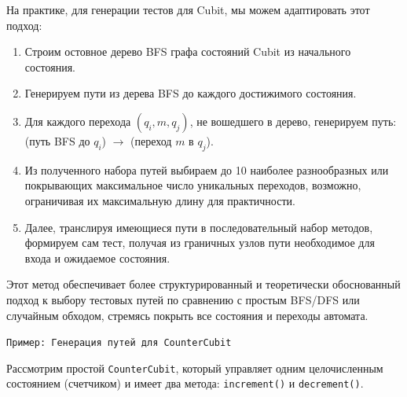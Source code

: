 \documentclass[14pt, russian]{scrartcl}
\begin{document}
На практике, для генерации тестов для Cubit, мы можем адаптировать этот подход:
\begin{enumerate}
    \item Строим остовное дерево BFS графа состояний Cubit из начального состояния.
    \item Генерируем пути из дерева BFS до каждого достижимого состояния.
    \item Для каждого перехода $(q_i, m, q_j)$, не вошедшего в дерево, генерируем путь: (путь BFS до $q_i$) $\rightarrow$ (переход $m$ в $q_j$).
    \item Из полученного набора путей выбираем до 10 наиболее разнообразных или покрывающих максимальное число уникальных переходов, возможно, ограничивая их максимальную длину для практичности.
    \item Далее, транслируя имеющиеся пути в последовательный набор методов, формируем сам тест, получая из граничных узлов пути необходимое для входа и ожидаемое состояния.
\end{enumerate}

Этот метод обеспечивает более структурированный и теоретически обоснованный подход к выбору тестовых путей по сравнению с простым BFS/DFS или случайным обходом, стремясь покрыть все состояния и переходы автомата.

\texttt{Пример: Генерация путей для CounterCubit}

Рассмотрим простой \texttt{CounterCubit}, который управляет одним целочисленным состоянием (счетчиком) и имеет два метода: \texttt{increment()} и \texttt{decrement()}.
\end{document}
